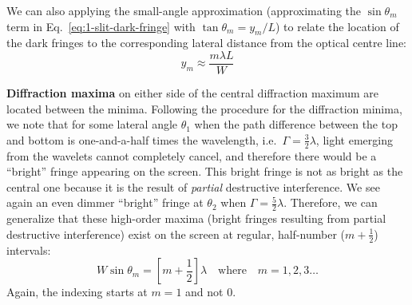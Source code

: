 We can also applying the small-angle approximation (approximating the
$\sin\theta_m$ term in Eq.~\ref{eq:1-slit-dark-fringe} with
$\tan\theta_m=y_m/L$) to relate the location of the dark fringes to the
corresponding lateral distance from the optical centre line:
\begin{equation}
  \boxed{y_m\approx\frac{m\lambda L}W}
\end{equation}


  

\textbf{Diffraction maxima} on either side of the central diffraction maximum
are located between the minima. Following the procedure for the diffraction
minima, we note that for some lateral angle $\theta_1$ when the path difference
between the top and bottom is one-and-a-half times the wavelength, i.e.\
$\Gamma=\frac32\lambda$, light emerging from the wavelets cannot completely
cancel, and therefore there would be a ``bright'' fringe appearing on the
screen. This bright fringe is not as bright as the central one because it is
the result of \emph{partial} destructive interference. We see again an even
dimmer ``bright'' fringe at $\theta_2$ when $\Gamma=\frac52\lambda$. Therefore,
we can generalize that these high-order maxima (bright fringes resulting from
partial destructive interference) exist on the screen at regular, half-number
($m+\frac12$) intervals:
\begin{equation}
  \boxed{
    W\sin\theta_m = \left[m+\frac12\right]\lambda
  }
  \quad\text{where}\quad m=1,2,3\ldots
\end{equation}
Again, the indexing starts at $m=1$ and not 0.

